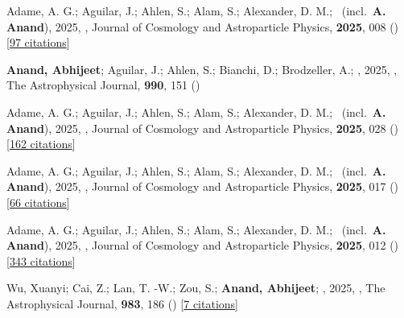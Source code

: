 \item[{\color{numcolor}\scriptsize20}] Adame, A. G.; Aguilar, J.; Ahlen, S.; Alam, S.; Alexander, D. M.; \etal\ (incl.\ \textbf{A. Anand}), 2025, , Journal of Cosmology and Astroparticle Physics, \textbf{2025}, 008 () [\href{https://ui.adsabs.harvard.edu/abs/2025JCAP...09..008A}{97 citations}]

\item[{\color{numcolor}\scriptsize19}] \textbf{Anand, Abhijeet}; Aguilar, J.; Ahlen, S.; Bianchi, D.; Brodzeller, A.; \etal, 2025, , The Astrophysical Journal, \textbf{990}, 151 ()

\item[{\color{numcolor}\scriptsize18}] Adame, A. G.; Aguilar, J.; Ahlen, S.; Alam, S.; Alexander, D. M.; \etal\ (incl.\ \textbf{A. Anand}), 2025, , Journal of Cosmology and Astroparticle Physics, \textbf{2025}, 028 () [\href{https://ui.adsabs.harvard.edu/abs/2025JCAP...07..028A}{162 citations}]

\item[{\color{numcolor}\scriptsize17}] Adame, A. G.; Aguilar, J.; Ahlen, S.; Alam, S.; Alexander, D. M.; \etal\ (incl.\ \textbf{A. Anand}), 2025, , Journal of Cosmology and Astroparticle Physics, \textbf{2025}, 017 () [\href{https://ui.adsabs.harvard.edu/abs/2025JCAP...07..017A}{66 citations}]

\item[{\color{numcolor}\scriptsize16}] Adame, A. G.; Aguilar, J.; Ahlen, S.; Alam, S.; Alexander, D. M.; \etal\ (incl.\ \textbf{A. Anand}), 2025, , Journal of Cosmology and Astroparticle Physics, \textbf{2025}, 012 () [\href{https://ui.adsabs.harvard.edu/abs/2025JCAP...04..012A}{343 citations}]

\item[{\color{numcolor}\scriptsize15}] Wu, Xuanyi; Cai, Z.; Lan, T. -W.; Zou, S.; \textbf{Anand, Abhijeet}; \etal, 2025, , The Astrophysical Journal, \textbf{983}, 186 () [\href{https://ui.adsabs.harvard.edu/abs/2025ApJ...983..186W}{7 citations}]

